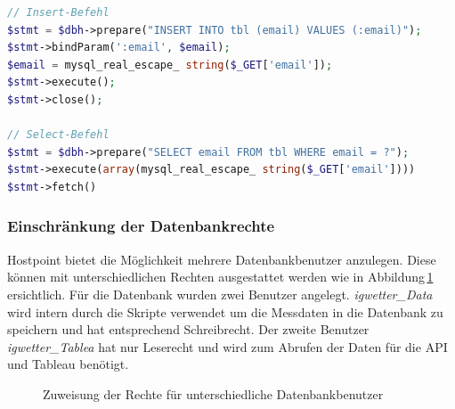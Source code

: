 
\vspace{3mm}
\begin{lstlisting}[label=lst:maskierung,caption=Anwendung der Prepared Statements (gekürzt), language=PHP, style=PHP]
// Insert-Befehl
$stmt = $dbh->prepare("INSERT INTO tbl (email) VALUES (:email)");
$stmt->bindParam(':email', $email);
$email = mysql_real_escape_ string($_GET['email']);
$stmt->execute();
$stmt->close();

// Select-Befehl
$stmt = $dbh->prepare("SELECT email FROM tbl WHERE email = ?");
$stmt->execute(array(mysql_real_escape_ string($_GET['email'])))
$stmt->fetch()
\end{lstlisting}
\vspace{3mm}



\subsubsection{Einschränkung der Datenbankrechte}
Hostpoint bietet die Möglichkeit mehrere Datenbankbenutzer anzulegen. Diese können mit unterschiedlichen Rechten ausgestattet werden wie in Abbildung\,\ref{img:dbnutzer} ersichtlich.
Für die Datenbank wurden zwei Benutzer angelegt. \emph{igwetter\_Data} wird intern durch die Skripte verwendet um die Messdaten in die Datenbank zu speichern und hat entsprechend Schreibrecht. Der zweite Benutzer \emph{igwetter\_Tablea} hat nur Leserecht und wird zum Abrufen der Daten für die API und Tableau benötigt.

\begin{figure}[htbp!]
	\centering
	\caption{Zuweisung der Rechte für unterschiedliche Datenbankbenutzer}
	\label{img:dbnutzer}
\end{figure}


